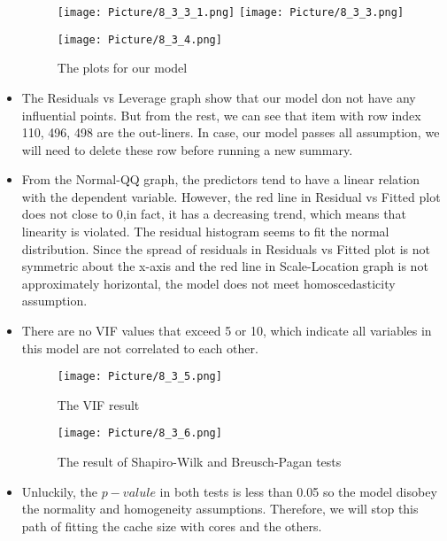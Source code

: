 \documentclass[a4paper]{article}
\begin{document}
\begin{itemize}
    \begin{figure}[H]
        \centering
        \texttt{[image: Picture/8\_3\_3\_1.png]}
        \texttt{[image: Picture/8\_3\_3.png]}
        \label{8.3.3}
    \end{figure}
    
    \begin{figure}[H]
        \centering
        \texttt{[image: Picture/8\_3\_4.png]}
        \caption{The plots for our model}
        \label{8.3.4}
    \end{figure}
    
    
    \item[] The Residuals vs Leverage graph show that our model don not have any influential points. But from the rest, we can see that item with row index 110, 496, 498 are the out-liners. In case, our model passes all assumption, we will need to delete these row before running a new summary.
    
    \item[] From the Normal-QQ graph, the predictors tend to have a linear relation with the dependent variable. However, the red line in Residual vs Fitted plot does not close to 0,in fact, it has a decreasing trend, which means that linearity is violated. The residual histogram seems to fit the normal distribution. Since the spread of residuals in Residuals vs Fitted plot is not symmetric about the x-axis and the red line in Scale-Location graph is not approximately horizontal, the model does not meet homoscedasticity assumption.
    
    \item[] There are no VIF values that exceed 5 or 10, which indicate all variables in this model are not correlated to each other.
    \begin{figure}[H]
        \centering
        \texttt{[image: Picture/8\_3\_5.png]}
        \caption{The VIF result}
        \label{8.3.4}
    \end{figure}
    
    \begin{figure}[H]
        \centering
        \texttt{[image: Picture/8\_3\_6.png]}
        \caption{The result of Shapiro-Wilk and Breusch-Pagan tests}
        \label{8.3.4}
    \end{figure}
    
    \item[] Unluckily, the $p-valule$ in both tests is less than 0.05 so the model disobey the normality and homogeneity assumptions. Therefore, we will stop this path of fitting the cache size with cores and the others.
\end{itemize}
\end{document}
